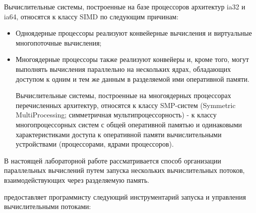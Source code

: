 Вычислительные системы, построенные на базе процессоров архитектур ia32 и ia64, %
относятся к классу SIMD по следующим причинам:

\begin{itemize}

	\item Одноядерные процессоры реализуют конвейерные вычисления и виртуальные многопоточные вычисления;
	\item Многоядерные процессоры также реализуют конвейеры и, кроме того, могут выполнять вычисления параллельно на нескольких ядрах, обладающих доступом к одним и тем же данным в разделяемой ими оперативной памяти.

	Вычислительные системы, построенные на многоядерных процессорах перечисленных архитектур, относятся к классу SMP-систем (Symmetric MultiProcessing; симметричная мультипроцессорность) - к классу многопроцессорных систем с общей оперативной памятью и одинаковыми характеристиками доступа к оперативной памяти вычислительными устройствами (процессорами, ядрами процессоров).

\end{itemize}

В настоящей лабораторной работе рассматривается способ организации параллельных вычислений путем запуска нескольких вычислительных потоков, взаимодействующих через разделяемую память.


\gl предоставляет программисту следующий инструментарий запуска и управления вычислительными потоками:

